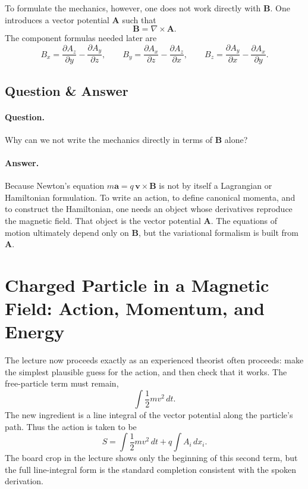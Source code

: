 To formulate the mechanics, however, one does not work directly with \(\mathbf B\). One introduces a vector potential \(\mathbf A\) such that
\begin{equation}
\mathbf B = \nabla\times \mathbf A.
\end{equation}
The component formulas needed later are
\begin{equation}
B_x=\frac{\partial A_z}{\partial y}-\frac{\partial A_y}{\partial z},
\qquad
B_y=\frac{\partial A_x}{\partial z}-\frac{\partial A_z}{\partial x},
\qquad
B_z=\frac{\partial A_y}{\partial x}-\frac{\partial A_x}{\partial y}.
\end{equation}

\subsection{Question \& Answer}

\paragraph{Question.} Why can we not write the mechanics directly in terms of \(\mathbf B\) alone?

\paragraph{Answer.} Because Newton's equation \(m\mathbf a=q\,\mathbf v\times \mathbf B\) is not by itself a Lagrangian or Hamiltonian formulation. To write an action, to define canonical momenta, and to construct the Hamiltonian, one needs an object whose derivatives reproduce the magnetic field. That object is the vector potential \(\mathbf A\). The equations of motion ultimately depend only on \(\mathbf B\), but the variational formalism is built from \(\mathbf A\).

\section{Charged Particle in a Magnetic Field: Action, Momentum, and Energy}

The lecture now proceeds exactly as an experienced theorist often proceeds: make the simplest plausible guess for the action, and then check that it works. The free-particle term must remain,
\[
\int \frac12 mv^2\,dt.
\]
The new ingredient is a line integral of the vector potential along the particle's path. Thus the action is taken to be
\begin{equation}
S=\int \frac12 mv^2\,dt + q\int A_i\,dx_i.
\end{equation}
The board crop in the lecture shows only the beginning of this second term, but the full line-integral form is the standard completion consistent with the spoken derivation.

